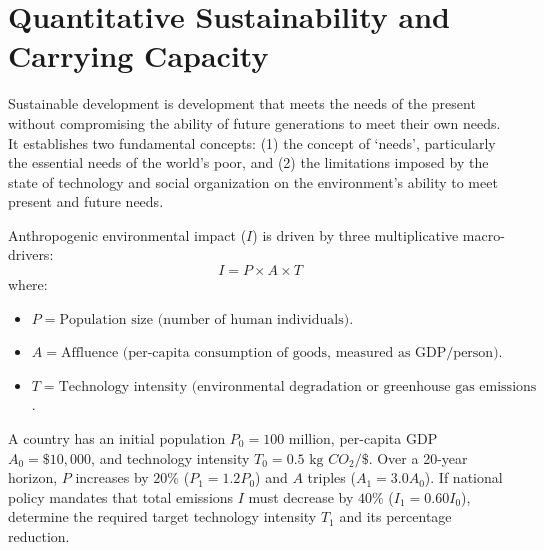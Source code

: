 \section{Quantitative Sustainability and Carrying Capacity}
\begin{theorem}
Sustainable development is development that meets the needs of the present without compromising the ability of future generations to meet their own needs. It establishes two fundamental concepts: (1) the concept of `needs', particularly the essential needs of the world's poor, and (2) the limitations imposed by the state of technology and social organization on the environment's ability to meet present and future needs.
\end{theorem}

\begin{keyequation}
Anthropogenic environmental impact ($I$) is driven by three multiplicative macro-drivers:
\begin{equation}
I = P \times A \times T
\end{equation}
where:
\begin{itemize}[leftmargin=1.5em]
    \item $P = \text{Population size (number of human individuals)}$.
    \item $A = \text{Affluence (per-capita consumption of goods, measured as GDP/person)}$.
    \item $T = \text{Technology intensity (environmental degradation or greenhouse gas emissions per unit consumption)}$.
\end{itemize}
\end{keyequation}

\begin{example}
A country has an initial population $P_0 = 100\text{ million}$, per-capita GDP $A_0 = \$10{,}000$, and technology intensity $T_0 = 0.5\text{ kg } CO_2/\$$. Over a 20-year horizon, $P$ increases by $20\%$ ($P_1 = 1.2 P_0$) and $A$ triples ($A_1 = 3.0 A_0$). If national policy mandates that total emissions $I$ must decrease by $40\%$ ($I_1 = 0.60 I_0$), determine the required target technology intensity $T_1$ and its percentage reduction.
\end{example}

